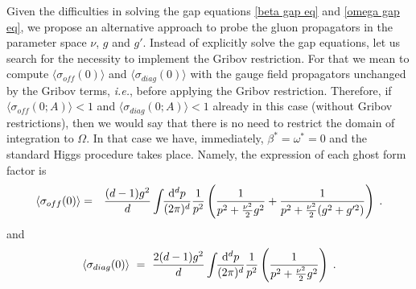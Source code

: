 Given the difficulties in solving the gap equations \eqref{beta gap eq} and \eqref{omega gap eq}, we propose an alternative approach to probe the gluon propagators in the parameter space $\nu$, $g$ and $g'$. Instead of explicitly solve the gap equations, let us search for the necessity to implement the Gribov restriction. For that we mean to compute $\langle \sigma_{off}(0) \rangle $ and $\langle \sigma_{diag}(0) \rangle$ with the gauge field propagators unchanged by the Gribov terms, {\it i.e.}, before applying the Gribov restriction. Therefore, if $\langle \sigma_{off}(0;A) \rangle  < 1$ and $\langle \sigma_{diag}(0;A) \rangle < 1$ already in this case (without Gribov restrictions), then we would say that there is no need to restrict the domain of integration to $\Omega$. In that case we have, immediately, $\beta^* = \omega^* =0$ and the standard Higgs procedure takes place. Namely, the expression of each ghost form factor is
\begin{eqnarray}
\langle \sigma_{off}(0) \rangle & = &  \frac{(d-1)g^{2}}{d}  \int\!\!  \frac{\mathrm{d}^d p}{(2\pi)^d} \frac{1}{p^{2}}\left(\frac{1}{p^{2} + \frac{\nu^{2}}{2}g^{2}} + \frac{1}{p^{2} + \frac{\nu^{2}}{2}(g^{2}+g'^{2})} \right)  \;.
\label{sgoff1}
\end{eqnarray}
and
\begin{equation}
\langle \sigma_{diag}(0) \rangle ~=~ \frac{2(d-1)g^{2}}{d} \int\!\!\frac{\mathrm{d}^{d}p}{(2\pi)^{d}}\frac{1}{p^{2}}\left(\frac{1}{p^{2} + \frac{\nu^{2}}{2}g^{2}}\right)  \;.
\label{sgdiag1}
\end{equation}







